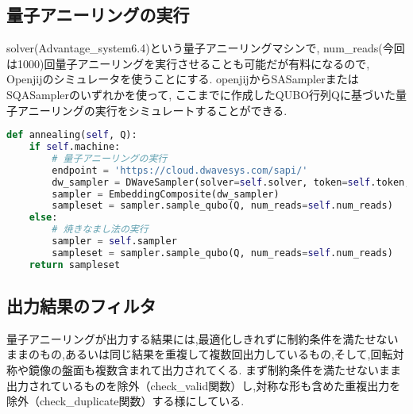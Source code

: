 \documentclass[uplatex,dvipdfmx,a4paper,11pt,oneside,openany]{jsbook}
\begin{document}
\subsection{量子アニーリングの実行}

solver(Advantage\_system6.4)という量子アニーリングマシンで, num\_reads(今回は1000)回量子アニーリングを実行させることも可能だが有料になるので, Openjijのシミュレータを使うことにする. openjijからSASamplerまたはSQASamplerのいずれかを使って, ここまでに作成したQUBO行列Qに基づいた量子アニーリングの実行をシミュレートすることができる.

\begin{lstlisting}[language=Python]
  def annealing(self, Q):
    if self.machine:
        # 量子アニーリングの実行
        endpoint = 'https://cloud.dwavesys.com/sapi/'
        dw_sampler = DWaveSampler(solver=self.solver, token=self.token, endpoint=endpoint)
        sampler = EmbeddingComposite(dw_sampler)
        sampleset = sampler.sample_qubo(Q, num_reads=self.num_reads)
    else:
        # 焼きなまし法の実行
        sampler = self.sampler
        sampleset = sampler.sample_qubo(Q, num_reads=self.num_reads)
    return sampleset
\end{lstlisting}

\subsection{出力結果のフィルタ}

量子アニーリングが出力する結果には,最適化しきれずに制約条件を満たせないままのもの,あるいは同じ結果を重複して複数回出力しているもの,そして,回転対称や鏡像の盤面も複数含まれて出力されてくる.
まず制約条件を満たせないまま出力されているものを除外（check\_valid関数）し,対称な形も含めた重複出力を除外（check\_duplicate関数）する様にしている.
\end{document}
